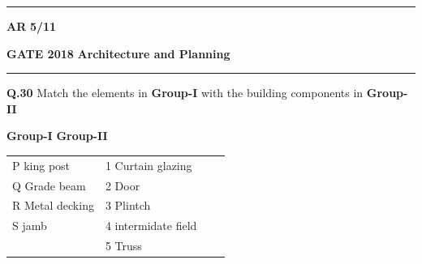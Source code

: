 \documentclass{article}
\begin{document}
 \noindent
\hrule \vspace{0.0875CM} \textbf{AR} \hfill  \textbf{5/11}
 
\newpage

\noindent
\textbf{GATE 2018} \hfill \textbf{Architecture and Planning}
\vspace{0.0012cm} \hrule
\vspace{0.5cm}

\textbf{Q.30}\hspace{0.5cm} Match the elements in \textbf{Group-I} with the building components in \textbf{Group-II}

\vspace{0.15cm}

\hspace{3cm}  \textbf{Group-I}\hspace{8cm} \textbf{Group-II} \\
\vspace{0.15cm}
\begin{tabular}{llcl}
\vspace{0.15cm}
\hspace{2cm} P  \hspace{0.3cm}king post &\hspace{6cm} 1 \hspace{0.3cm}Curtain glazing \\
\vspace{0.15cm}
\hspace{2cm} Q \hspace{0.3cm}Grade beam &\hspace{6cm} 2\hspace{0.3cm}\hspace{0.3cm}  Door              \\
\vspace{0.15cm}
\hspace{2cm} R  \hspace{0.3cm} Metal decking  &\hspace{6cm} 3 \hspace{0.3cm}Plintch                 \\
\vspace{0.15cm}
\hspace{2cm} S  \hspace{0.3cm}jamb   &\hspace{6cm} 4 \hspace{0.3cm} intermidate field       \\
                        &\hspace{6cm} 5\hspace{0.3cm}  Truss 
\end{tabular}
\vspace{0.15cm}
\end{document}
